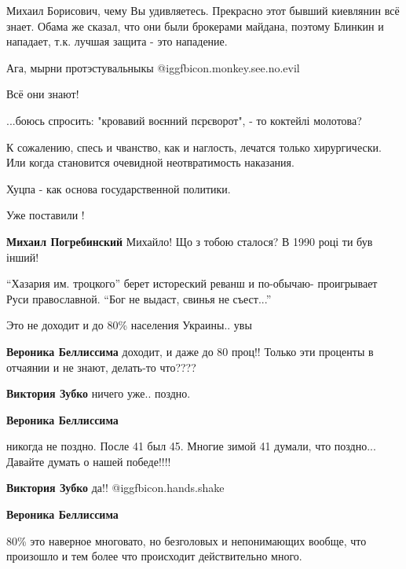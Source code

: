 \begin{itemize}

Михаил Борисович, чему Вы удивляетесь. Прекрасно этот бывший киевлянин всё
знает. Обама же сказал, что они были брокерами майдана, поэтому Блинкин и
нападает, т.к. лучшая защита - это нападение.


Ага, мырни протэстувальныкы  @igg{fbicon.monkey.see.no.evil} 

Всё они знают!

...боюсь спросить: "кровавий воєнний пєрєворот", - то коктейлі молотова?

К сожалению, спесь и чванство, как и наглость, лечатся только хирургически. Или
когда становится очевидной неотвратимость наказания.


Хуцпа - как основа государственной политики.

Уже поставили !

\textbf{Михаил Погребинский} Михайло! Що з тобою сталося? В 1990 році ти був інший!


\enquote{Хазария им. троцкого} берет истореский реванш и по-обычаю- проигрывает Руси
православной. \enquote{Бог не выдаст, свинья не съест...}

Это не доходит и до 80\% населения Украины.. увы

\begin{itemize} %

\textbf{Вероника Беллиссима} доходит, и даже до 80 проц!! Только эти проценты в отчаянии и не знают, делать-то что????

\textbf{Виктория Зубко} ничего уже.. поздно.

\textbf{Вероника Беллиссима} 

никогда не поздно. После 41 был 45. Многие зимой 41 думали, что поздно...
Давайте думать о нашей победе!!!!

\textbf{Виктория Зубко} да!! @igg{fbicon.hands.shake} 

\textbf{Вероника Беллиссима} 

80\% это наверное многовато, но безголовых и непонимающих вообще, что произошло и
тем более что происходит действительно много.


\end{itemize}
\end{itemize}
